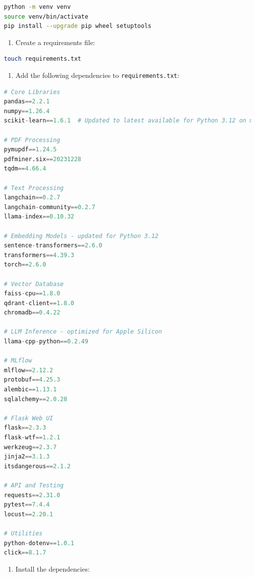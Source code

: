 \documentclass[
  screen,review,acmlarge]{acmart}
\newcommand{\passthrough}[1]{#1}
\providecommand{\tightlist}{%
  \setlength{\itemsep}{0pt}\setlength{\parskip}{0pt}}
\begin{document}
\begin{lstlisting}[language=bash]
python -m venv venv
source venv/bin/activate
pip install --upgrade pip wheel setuptools
\end{lstlisting}

\begin{enumerate}
\def\labelenumi{\arabic{enumi}.}
\setcounter{enumi}{2}
\tightlist
\item
  Create a requirements file:
\end{enumerate}

\begin{lstlisting}[language=bash]
touch requirements.txt
\end{lstlisting}

\begin{enumerate}
\def\labelenumi{\arabic{enumi}.}
\setcounter{enumi}{3}
\tightlist
\item
  Add the following dependencies to \passthrough{\lstinline!requirements.txt!}:
\end{enumerate}

\begin{lstlisting}[language=Python]
# Core Libraries
pandas==2.2.1
numpy==1.26.4
scikit-learn==1.6.1  # Updated to latest available for Python 3.12 on macOS ARM64

# PDF Processing
pymupdf==1.24.5
pdfminer.six==20231228
tqdm==4.66.4

# Text Processing
langchain==0.2.7
langchain-community==0.2.7
llama-index==0.10.32

# Embedding Models - updated for Python 3.12
sentence-transformers==2.6.0
transformers==4.39.3
torch==2.6.0

# Vector Database
faiss-cpu==1.8.0
qdrant-client==1.8.0
chromadb==0.4.22

# LLM Inference - optimized for Apple Silicon
llama-cpp-python==0.2.49

# MLflow
mlflow==2.12.2
protobuf==4.25.3
alembic==1.13.1
sqlalchemy==2.0.28

# Flask Web UI
flask==2.3.3
flask-wtf==1.2.1
werkzeug==2.3.7
jinja2==3.1.3
itsdangerous==2.1.2

# API and Testing
requests==2.31.0
pytest==7.4.4
locust==2.20.1

# Utilities
python-dotenv==1.0.1
click==8.1.7
\end{lstlisting}

\begin{enumerate}
\def\labelenumi{\arabic{enumi}.}
\setcounter{enumi}{4}
\tightlist
\item
  Install the dependencies:
\end{enumerate}
\end{document}
